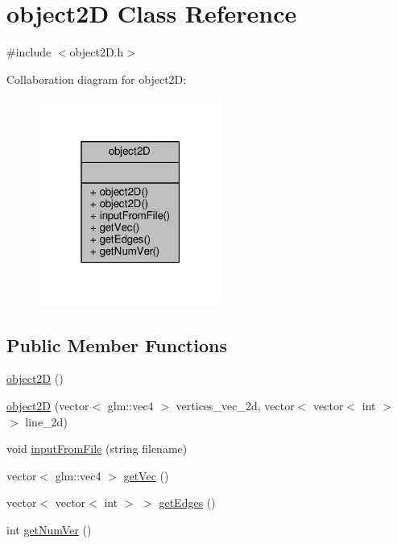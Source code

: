 \hypertarget{classobject2D}{}\section{object2D Class Reference}
\label{classobject2D}


{\ttfamily \#include $<$object2\+D.\+h$>$}



Collaboration diagram for object2D\+:
\nopagebreak
\begin{figure}[H]
\begin{center}
\leavevmode
\includegraphics[width=171pt]{classobject2D__coll__graph}
\end{center}
\end{figure}
\subsection*{Public Member Functions}
\begin{DoxyCompactItemize}
\item 
\mbox{\hyperlink{classobject2D_a2169d77e7375f31356d2524c26c0a63f}{object2D}} ()
\item 
\mbox{\hyperlink{classobject2D_a7c2dd1d0bae14f68311ffa3194c7b848}{object2D}} (vector$<$ glm\+::vec4 $>$ vertices\+\_\+vec\+\_\+2d, vector$<$ vector$<$ int $>$ $>$ line\+\_\+2d)
\item 
void \mbox{\hyperlink{classobject2D_a6697aecc21bb2348fb81950cc0d83c83}{input\+From\+File}} (string filename)
\item 
vector$<$ glm\+::vec4 $>$ \mbox{\hyperlink{classobject2D_a529cdc088990e491fef49b97f58c9a5a}{get\+Vec}} ()
\item 
vector$<$ vector$<$ int $>$ $>$ \mbox{\hyperlink{classobject2D_a22bb00cbc061128b26645e6cdf7a2117}{get\+Edges}} ()
\item 
int \mbox{\hyperlink{classobject2D_a957470b9b7c66bf1def476cd4b7d5fde}{get\+Num\+Ver}} ()
\end{DoxyCompactItemize}


